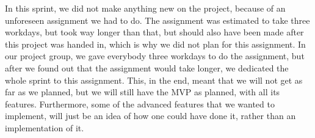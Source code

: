 In this sprint, we did not make anything new on the project, because of an unforeseen assignment we had to do.
The assignment was estimated to take three workdays, but took way longer than that, but should also have been made after this project was handed in, which is why we did not plan for this assignment.
In our project group, we gave everybody three workdays to do the assignment, but after we found out that the assignment would take longer, we dedicated the whole sprint to this assignment.
This, in the end, meant that we will not get as far as we planned, but we will still have the MVP as planned, with all its features.
Furthermore, some of the advanced features that we wanted to implement, will just be an idea of how one could have done it, rather than an implementation of it.